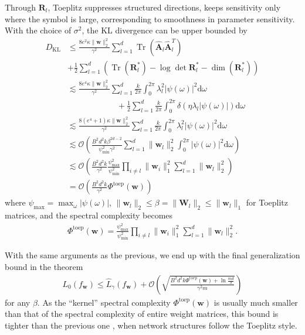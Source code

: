 \documentclass[journal]{IEEEtran} %
\newcommand{\nn}{\nonumber}
\def\vw{{\bm{w}}}
\def\mA{{\bm{A}}}
\def\mR{{\bm{R}}}
\def\mW{{\bm{W}}}
\def\gO{{\mathcal{O}}}
\newcommand{\KL}{D_{\mathrm{KL}}}
\newcommand{\Norm}[1]{\|#1\|}
\newcommand{\Abs}[1]{|#1|}
\DeclareMathOperator{\Tr}{Tr}
\begin{document}
Through $\mR_l$, Toeplitz suppresses structured directions, keeps sensitivity only where the symbol is large, corresponding to smoothness in parameter sensitivity.
% 
With the choice of $\sigma^2$, the KL divergence can be upper bounded by
\begin{align}
    \KL & \le \frac{8e^{2} \kappa\Norm{\vw}_2^2}{\gamma^2} \sum_{l=1}^d \Tr(\hat{\mA}_l \hat{\mA}_l^T) \nn \\
    &  + \frac{1}{2} \sum_{l=1}^d \left(\Tr(\mR_l^*)  - \log \det \mR_l^* - \dim(\mR_l^*) \right)\\
    &\lesssim \frac{8 e^4 \kappa  \Norm{\vw}_2^2}{\gamma^2 }   \sum_{l=1}^d \frac{k}{2\pi} \int_{0}^{2\pi} \lambda_l^2 \Abs{\psi(\omega)}^2 \mathrm{d} \omega \nn \\
    & \qquad \qquad \qquad + \frac{1}{2}\sum_{l=1}^d \frac{k}{2\pi} \int_{0}^{2\pi} \delta({\eta}{\lambda}_l \Abs{\psi(\omega)}) \mathrm{d} \omega\\
    &\lesssim \frac{8 (e^4+1) \kappa  \Norm{\vw}_2^2 }{\gamma^2 } \sum_{l=1}^d \frac{k}{2\pi} \int_{0}^{2\pi} \lambda_l^2 \Abs{\psi(\omega)}^2 \mathrm{d} \omega\\
    &\lesssim \gO\left(  \frac{B^2 d^2 k \beta^{2d-2}}{\psi_{\min}^2 \gamma^2} \sum_{l=1}^d \Norm{\vw_l}_2^2 \int_{0}^{2\pi} \Abs{\psi(\omega)}^2 \mathrm{d} \omega\right) \\
    &\lesssim \gO\left(\frac{B^2d^2k}{\gamma^2} \frac{\psi_{\max}^2}{\psi_{\min}^2} \prod_{i\ne l} \Norm{\vw_i}_1^2 \sum_{l=1}^d \Norm{\vw_l}_2^2\right)\\
    &=\gO\left(\frac{B^2d^2k}{\gamma^2} \Phi^{\mathrm{toep}}(\vw)\right)
\end{align}
where $\psi_{\max}=\max_{\omega}\Abs{\psi(\omega)}$, $\Norm{\vw_l}_2 \le \beta=\Norm{\mW_l}_2 \le \Norm{\vw_l}_1$ for Toeplitz matrices, and the spectral complexity becomes
\begin{align}
    \Phi^{\mathrm{toep}}(\vw)=\frac{\psi_{\max}^2}{\psi_{\min}^2} \prod_{i\ne l} \Norm{\vw_i}_1^2 \sum_{l=1}^d \Norm{\vw_l}_2^2. 
\end{align}

With the same arguments as the previous, we end up with the final generalization bound in the theorem 
\begin{align}
    L_0(f_{\vw}) \le \hat{L}_{\gamma}(f_{\vw}) + \mathcal{O} \left( \sqrt{ \frac{B^2d^2k \Phi^{\mathrm{toep}}(\vw) + \ln \frac{md}{\delta}}{\gamma^2m}} \right)
\end{align}
for any ${\beta}$. As the ``kernel'' spectral complexity $\Phi^{\mathrm{toep}}(\vw)$ is usually much smaller than that of the spectral complexity of entire weight matrices, this bound is tighter than the previous one \cite{neyshabur2018pac}, when network structures follow the Toeplitz style.
\end{document}
